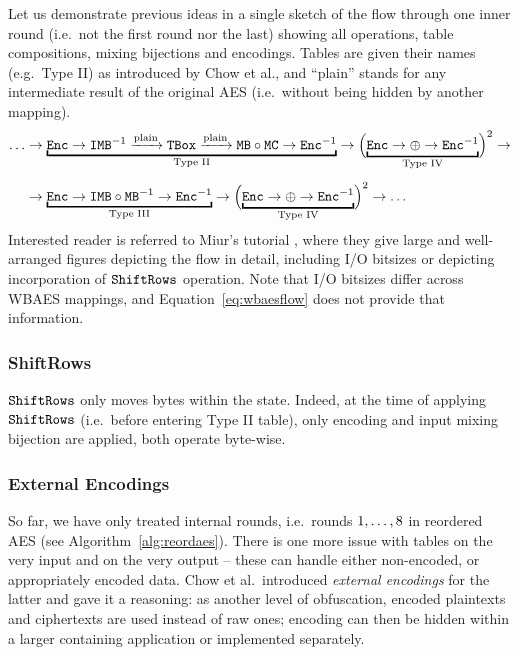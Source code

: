 	Let us demonstrate previous ideas in a single sketch of the flow through one inner round (i.e.\ not the first round nor the last) showing all operations, table compositions, mixing bijections and encodings. Tables are given their names (e.g.\ Type II) as introduced by Chow et al., and ``plain'' stands for any intermediate result of the original AES (i.e.\ without being hidden by another mapping).
	\begin{align}
	\label{eq:wbaesflow}
		\ldots&\rarr\underbracket{\Enc\rarr\IMB^{-1}\xrightarrow{\textnormal{plain}}\TBox\xrightarrow{\textnormal{plain}}\MB\circ\MC\rarr\Enc^{-1}}_{\textnormal{Type II}}\rarr\Bigl(\underbracket{\Enc\rarr\xor\rarr\Enc^{-1}}_{\textnormal{Type IV}}\Bigr)^2\rarr\nonumber\\[.5em]
		&\rarr\underbracket{\Enc\rarr\IMB\circ\MB^{-1}\rarr\Enc^{-1}}_{\textnormal{Type III}}\rarr\Bigl(\underbracket{\Enc\rarr\xor\rarr\Enc^{-1}}_{\textnormal{Type IV}}\Bigr)^2\rarr\ldots
	\end{align}
	Interested reader is referred to Miur's tutorial \cite{muir2013tutorial}, where they give large and well-arranged figures depicting the flow in detail, including I/O bitsizes or depicting incorporation of $\texttt{ShiftRows}$ operation. Note that I/O bitsizes differ across WBAES mappings, and Equation~\ref{eq:wbaesflow} does not provide that information.
	
\subsubsection{ShiftRows}
	
	$\texttt{ShiftRows}$ only moves bytes within the state. Indeed, at the time of applying $\texttt{ShiftRows}$ (i.e.\ before entering Type II table), only encoding and input mixing bijection are applied, both operate byte-wise.

\subsubsection{External Encodings}
	
	So far, we have only treated internal rounds, i.e.\ rounds $1 , \ldots , 8$ in reordered AES (see Algorithm~\ref{alg:reordaes}). There is one more issue with tables on the very input and on the very output -- these can handle either non-encoded, or appropriately encoded data. Chow et al.\ introduced {\em external encodings} for the latter and gave it a reasoning: as another level of obfuscation, encoded plaintexts and ciphertexts are used instead of raw ones; encoding can then be hidden within a larger containing application or implemented separately.
	
